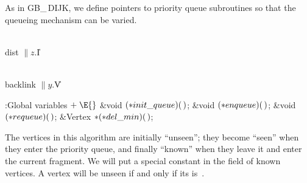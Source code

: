 As in {\sc GB\_\,DIJK}, we define pointers to priority queue subroutines
so that the queueing mechanism can be varied.

\Y\B\4\D\\{dist}\5
$\|z.{}$\|I\par
\B\4\D\\{backlink}\5
$\|y.{}$\|V\par
\Y\B\4:Global variables\X${}\mathrel+\E{}$\6
\&{void} ${}({*}\\{init\_queue})(\,){}$;\6
\&{void} ${}({*}\\{enqueue})(\,){}$;\6
\&{void} ${}({*}\\{requeue})(\,){}$;\6
\&{Vertex} ${}{*}({*}\\{del\_min})(\,){}$;\par
\fi

The vertices in this algorithm are initially ``unseen''; they become
``seen'' when they enter the priority queue, and finally ``known''
when they leave it and enter the current fragment.
We will put a special constant in the  field
of known vertices. A vertex will be unseen if and only if its
 is~\PB{$\NULL$}.

